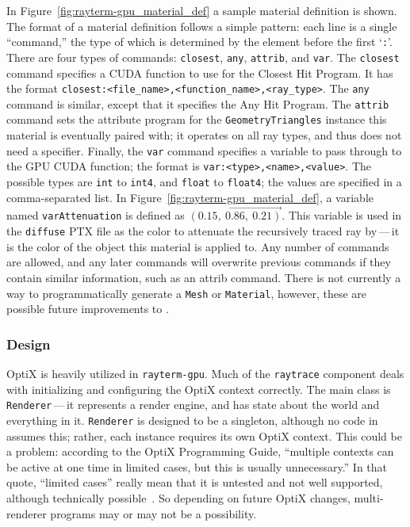 In Figure~\ref{fig:rayterm-gpu_material_def} a sample material definition is shown.
The format of a material definition follows a simple pattern: each line is a single ``command,'' the type of which is determined by the element before the first `\texttt{:}'.
There are four types of commands: \texttt{closest}, \texttt{any}, \texttt{attrib}, and \texttt{var}.
The \texttt{closest} command specifies a CUDA function to use for the Closest Hit Program.
It has the format \texttt{closest:<file\_name>,<function\_name>,<ray\_type>}.
The \texttt{any} command is similar, except that it specifies the Any Hit Program.
The \texttt{attrib} command sets the attribute program for the \texttt{GeometryTriangles} instance this material is eventually paired with; it operates on all ray types, and thus does not need a specifier.
Finally, the \texttt{var} command specifies a variable to pass through to the GPU CUDA function; the format is \texttt{var:<type>,<name>,<value>}.
The possible types are \texttt{int} to \texttt{int4}, and \texttt{float} to \texttt{float4}; the values are specified in a comma-separated list.
In Figure~\ref{fig:rayterm-gpu_material_def}, a variable named \texttt{varAttenuation} is defined as $\vec{(0.15,\ 0.86,\ 0.21)}$.
This variable is used in the \texttt{diffuse} PTX file as the color to attenuate the recursively traced ray by\,---\,it is the color of the object this material is applied to.
Any number of commands are allowed, and any later commands will overwrite previous commands if they contain similar information, such as an attrib command.
There is not currently a way to programmatically generate a \texttt{Mesh} or \texttt{Material}, however, these are possible future improvements to \name{}.


\subsubsection{Design}
\label{ch:methods:renderer:parallel:design}

OptiX is heavily utilized in \texttt{rayterm-gpu}.
Much of the \texttt{raytrace} component deals with initializing and configuring the OptiX context correctly.
The main class is \texttt{Renderer}\,---\,it represents a render engine, and has state about the world and everything in it.
\texttt{Renderer} is designed to be a singleton, although no code in \name{} assumes this; rather, each instance requires its own OptiX context.
This could be a problem: according to the OptiX Programming Guide, ``multiple contexts can be active at one time in limited cases, but this is usually unnecessary.''
In that quote, ``limited cases'' really mean that it is untested and not well supported, although technically possible~\cite{nvidia2019optixdoc}.
So depending on future OptiX changes, multi-renderer programs may or may not be a possibility.

